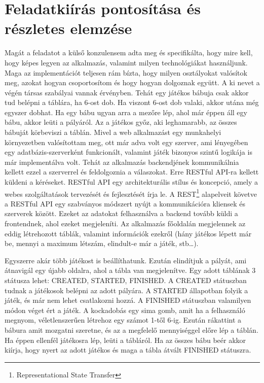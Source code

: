\documentclass[a4paper,twoside]{article}
\begin{document}
\section{Feladatkiírás pontosítása és részletes elemzése}
Magát a feladatot a külső konzulensem adta meg és specifikálta, hogy mire kell, hogy képes
legyen az alkalmazás, valamint milyen technológiákat használjunk. Maga az implementációt
teljesen rám bízta, hogy milyen osztályokat valósítok meg, azokat hogyan csoportosítom és
hogy hogyan dolgoznak együtt.
A ki nevet a végén társas szabályai vannak érvényben. Tehát egy játékos bábuja csak akkor
tud belépni a táblára, ha 6-ost dob. Ha viszont 6-ost dob valaki, akkor utána még egyszer
dobhat. Ha egy bábu ugyan arra a mezőre lép, ahol már éppen áll egy bábu, akkor leüti a
pályáról. Az a játékos győz, aki leghamarabb, az összes bábuját körbeviszi a táblán.
Mivel a web alkalmazást egy munkahelyi környezetben valósítottam meg, ott már adva volt
egy szerver, ami lényegében egy adatbázis-szerverként funkcionált, valamint játék bizonyos
szintű logikája is már implementálva volt. Tehát az alkalmazás backendjének kommunikálnia
kellett ezzel a szerverrel és feldolgoznia a válaszokat. Erre RESTful API-ra kellett küldeni a
kéréseket. RESTful API egy architekturális stílus és koncepció, amely a webes szolgáltatások
tervezését és fejlesztését írja le. A REST\footnote{Representational State Transfer} alapelveit követve
a RESTful API egy szabványos módszert nyújt a kommunikációra kliensek és szerverek
között. Ezeket az adatokat felhasználva a backend tovább küldi a frontendnek, ahol ezeket
megjeleníti.
Az alkalmazás főoldalán megjelennek az eddig létrehozott táblák, valamint információk
ezekről (hány játékos lépett már be, mennyi a maximum létszám, elindult-e már a játék,
stb…). 

Egyszerre akár több játékost is beállíthatunk. Ezután elindítjuk a pályát, ami átnavigál egy
újabb oldalra, ahol a tábla van megjelenítve. Egy adott táblának 3 státusza lehet: CREATED,
STARTED, FINISHED. A CREATED státuszban tudnak a játékosok belépni az adott pályára. A STARTED állapotban folyik a játék, és már nem lehet csatlakozni hozzá. A FINISHED státuszban valamilyen módon véget ért a játék. A kockadobás egy sima gomb, amit ha a
felhasználó megnyom, véletlenszerűen létrehoz egy számot 1-től 6-ig. Ezután rákattint a bábura amit mozgatni
szeretne, és az a megfelelő mennyiséggel előre lép a táblán. Ha éppen ellenfél játékosra lép,
leüti a tábláról. Ha az összes bábu beér akkor kiírja, hogy nyert az adott játékos és maga a
tábla átvált FINISHED státuszra.
\end{document}
